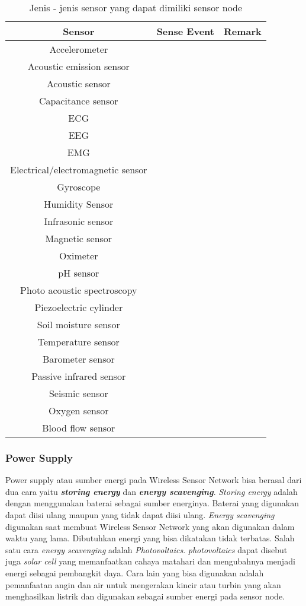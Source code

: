 \begin{table} [H]
	\centering 
	\caption{Jenis - jenis sensor yang dapat dimiliki sensor node}
	\label{tab:sensor}
	\begin{tabular}{|c|c|c|}
		\toprule
		Sensor & Sense Event & Remark\\

		\midrule
		Accelerometer & & \\
		Acoustic emission sensor &  & \\
		Acoustic sensor &  & \\
		Capacitance sensor &  & \\
		ECG &  & \\
		EEG &  & \\
		EMG &  & \\
		Electrical/electromagnetic sensor &  & \\
		Gyroscope &  & \\
		Humidity Sensor &  & \\
		Infrasonic sensor &  & \\
		Magnetic sensor &  & \\
		Oximeter &  & \\
		pH sensor &  & \\
		Photo acoustic spectroscopy &  & \\
		Piezoelectric cylinder  &  & \\
		Soil moisture sensor &  & \\
		Temperature sensor &  & \\
		Barometer sensor &  & \\
		Passive infrared sensor &  & \\
		Seismic sensor &  & \\
		Oxygen sensor &  & \\
		Blood flow sensor &  & \\

		\bottomrule
		
	\end{tabular} 
\end{table}

\subsubsection{Power Supply}
Power supply atau sumber energi pada Wireless Sensor Network bisa berasal dari dua cara yaitu \textbf{\textit{storing energy}} dan \textbf{\textit{energy scavenging}}. \textit{Storing energy} adalah dengan menggunakan baterai sebagai sumber energinya. Baterai yang digunakan dapat diisi ulang maupun yang tidak dapat diisi ulang. \textit{Energy scavenging} digunakan saat membuat Wireless Sensor Network yang akan digunakan dalam waktu yang lama. Dibutuhkan energi yang bisa dikatakan tidak terbatas. Salah satu cara \textit{energy scavenging} adalah \textit{Photovoltaics}. \textit{photovoltaics} dapat disebut juga \textit{solar cell} yang memanfaatkan cahaya matahari dan mengubahnya menjadi energi sebagai pembangkit daya. Cara lain yang bisa digunakan adalah pemanfaatan angin dan air untuk mengerakan kincir atau turbin yang akan menghasilkan listrik dan digunakan sebagai sumber energi pada sensor node.

